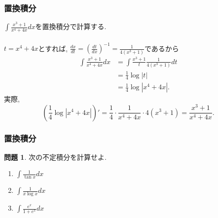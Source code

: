 \documentclass[dvipdfmx,cjk,10.2pt]{beamer}
\theoremstyle{definition}
\newtheorem{Prob}[Thm]{問題}
\begin{document}



\begin{frame}
\frametitle{置換積分}

$\int \frac{x^3+1}{x^4+4x} dx$を置換積分で計算する. \\
\ \\

$t=x^4+4x$とすれば, $\frac{dx}{dt}=(\frac{dt}{dx})^{-1}=\frac{1}{4(x^3+1)}$であるから
\begin{align*}
\int \frac{x^3+1}{x^4+4x} dx &=\int \frac{x^3+1}{t} \frac{1}{4(x^3+1)} dt \\
& = \frac{1}{4} \log|t| \\
& = \frac{1}{4} \log|x^4+4x|. 
\end{align*}
実際,
$$
(\frac{1}{4} \log|x^4+4x|)' = \frac{1}{4} \cdot \frac{1}{x^4+4x}\cdot 4(x^3+1)=  \frac{x^3+1}{x^4+4x}. 
$$


\end{frame}




\begin{frame}
\frametitle{置換積分}

\begin{Prob}
次の不定積分を計算せよ. 
\begin{enumerate}
\item $\int \frac{1}{\tan x} dx$
\item $\int \frac{1}{x \log x}dx$
\item $\int \frac{e^x}{1+e^x} dx$
\end{enumerate}
\end{Prob}

\end{frame}



\end{document}
